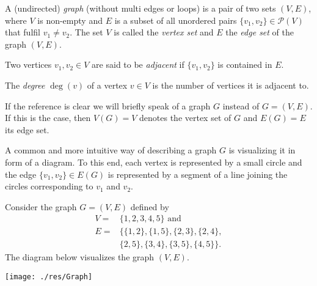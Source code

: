 \begin{defin}
\begin{thmlist}
\item A (undirected) \emph{graph} (without multi ed\-ges or loops) is a pair of two sets $(V,E)$, where $V$ is non-empty and $E$ is a subset of all unordered pairs $\lbrace v_1,v_2\rbrace\in\mathcal{P}(V)$ that fulfil $v_1\neq v_2$. The set $V$ is called the \emph{vertex set} and $E$ the \emph{edge set} of the graph $(V,E)$.
\item Two vertices $v_1,v_2\in V$ are said to be \emph{adjacent} if $\lbrace v_1,v_2\rbrace$ is contained in $E$.
\item The \emph{degree} $\deg(v)$ of a vertex $v\in V$ is the number of vertices it is adjacent to.
\end{thmlist}
\end{defin}


If the reference is clear we will briefly speak of a graph $G$ instead of $G=(V,E)$. If this is the case, then $V(G)=V$ denotes the vertex set of $G$ and $E(G)=E$ its edge set.

A common and more intuitive way of describing a graph $G$ is visualizing it in form of a diagram. To this end, each vertex is represented by a small circle and the edge $\lbrace v_1,v_2\rbrace\in E(G)$ is represented by a segment of a line joining the circles corresponding to $v_1$ and $v_2$.

\begin{exam}\label{ex:Graph}
Consider the graph $G=(V,E)$ defined by
\begin{align*}
V = &\lbrace 1,2,3,4,5\rbrace \text{ and}\\
E = &\lbrace\lbrace 1,2\rbrace, \lbrace 1, 5\rbrace, \lbrace 2, 3\rbrace, \lbrace 2, 4\rbrace, \\
 & \lbrace 2, 5 \rbrace, \lbrace 3, 4\rbrace, \lbrace 3, 5\rbrace, \lbrace 4, 5\rbrace\rbrace.
\end{align*}
The diagram below visualizes the graph $(V,E).$

\begin{center}
\texttt{[image: ./res/Graph]}
\end{center}
\end{exam}

